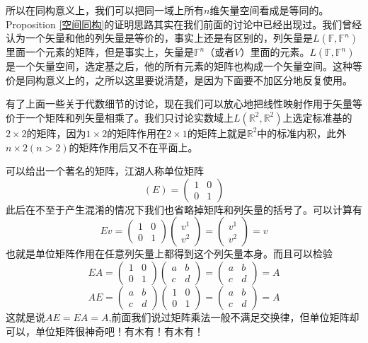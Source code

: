 \documentclass[11pt,a4paper,openany]{book}%
\theoremstyle{plain}%
\begin{document}
所以在同构意义上，我们可以把同一域上所有$n$维矢量空间看成是等同的。Proposition \ref{空间同构}的证明思路其实在我们前面的讨论中已经出现过。我们曾经认为一个矢量和他的列矢量是等价的，事实上还是有区别的，列矢量是$L(\mathbb{F},\mathbb{F}^n)$里面一个元素的矩阵，但是事实上，矢量是$\mathbb{F}^n$（或者$V$）里面的元素。$L(\mathbb{F},\mathbb{F}^n)$是一个矢量空间，选定基之后，他的所有元素的矩阵也构成一个矢量空间。这种等价是同构意义上的，之所以这里要说清楚，是因为下面要不加区分地反复使用。

有了上面一些关于代数细节的讨论，现在我们可以放心地把线性映射作用于矢量等价于一个矩阵和列矢量相乘了。我们只讨论实数域上$L(\mathbb{R}^2,\mathbb{R}^2)$上选定标准基的$2\times 2$的矩阵，因为$1\times 2$的矩阵作用在$2\times 1$的矩阵上就是$\mathbb{R}^2$中的标准内积，此外$n\times 2$$(n>2)$的矩阵作用后又不在平面上。

可以给出一个著名的矩阵，江湖人称单位矩阵
\[
(E)=\begin{pmatrix}
1&0\\
0&1
\end{pmatrix}
\]
此后在不至于产生混淆的情况下我们也省略掉矩阵和列矢量的括号了。可以计算有
\[
Ev=\begin{pmatrix}
1&0\\
0&1
\end{pmatrix}
\begin{pmatrix}
v^1\\
v^2
\end{pmatrix}
=
\begin{pmatrix}
v^1\\
v^2
\end{pmatrix}
=v
\]
也就是单位矩阵作用在任意列矢量上都得到这个列矢量本身。而且可以检验
\[
EA=\begin{pmatrix}
1&0\\
0&1
\end{pmatrix}
\begin{pmatrix}
a&b\\
c&d
\end{pmatrix}
=
\begin{pmatrix}
a&b\\
c&d
\end{pmatrix}
=A
\]
\[
AE=
\begin{pmatrix}
a&b\\
c&d
\end{pmatrix}
\begin{pmatrix}
1&0\\
0&1
\end{pmatrix}
=
\begin{pmatrix}
a&b\\
c&d
\end{pmatrix}
=A
\]
这就是说$AE=EA=A$,前面我们说过矩阵乘法一般不满足交换律，但单位矩阵却可以，单位矩阵很神奇吧！有木有！有木有！
\end{document}
